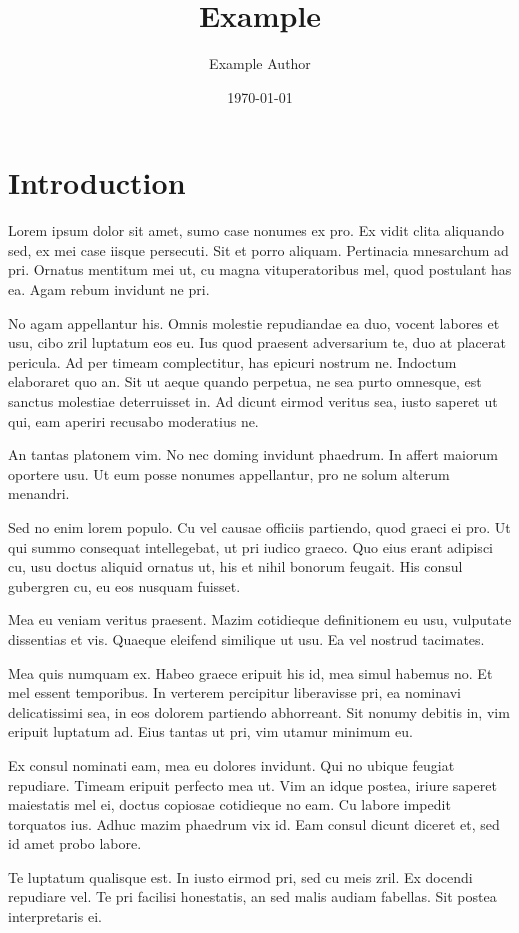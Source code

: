 \documentclass{article}
\title{Example}
\author {Example Author}
\date {\today}
\begin{document}
\maketitle
\listoffigures
\section{Introduction}
Lorem ipsum dolor sit amet, sumo case nonumes ex pro. Ex vidit clita aliquando sed, ex mei case iisque persecuti. Sit et porro aliquam. Pertinacia mnesarchum ad pri. Ornatus mentitum mei ut, cu magna vituperatoribus mel, quod postulant has ea. Agam rebum invidunt ne pri.


No agam appellantur his. Omnis molestie repudiandae ea duo, vocent labores et usu, cibo zril luptatum eos eu. Ius quod praesent adversarium te, duo at placerat pericula. Ad per timeam complectitur, has epicuri nostrum ne. Indoctum elaboraret quo an. Sit ut aeque quando perpetua, ne sea purto omnesque, est sanctus molestiae deterruisset in. Ad dicunt eirmod veritus sea, iusto saperet ut qui, eam aperiri recusabo moderatius ne.

An tantas platonem vim. No nec doming invidunt phaedrum. In affert maiorum oportere usu. Ut eum posse nonumes appellantur, pro ne solum alterum menandri.

Sed no enim lorem populo. Cu vel causae officiis partiendo, quod graeci ei pro. Ut qui summo consequat intellegebat, ut pri iudico graeco. Quo eius erant adipisci cu, usu doctus aliquid ornatus ut, his et nihil bonorum feugait. His consul gubergren cu, eu eos nusquam fuisset.

Mea eu veniam veritus praesent. Mazim cotidieque definitionem eu usu, vulputate dissentias et vis. Quaeque eleifend similique ut usu. Ea vel nostrud tacimates.

Mea quis numquam ex. Habeo graece eripuit his id, mea simul habemus no. Et mel essent temporibus. In verterem percipitur liberavisse pri, ea nominavi delicatissimi sea, in eos dolorem partiendo abhorreant. Sit nonumy debitis in, vim eripuit luptatum ad. Eius tantas ut pri, vim utamur minimum eu.

Ex consul nominati eam, mea eu dolores invidunt. Qui no ubique feugiat repudiare. Timeam eripuit perfecto mea ut. Vim an idque postea, iriure saperet maiestatis mel ei, doctus copiosae cotidieque no eam. Cu labore impedit torquatos ius. Adhuc mazim phaedrum vix id. Eam consul dicunt diceret et, sed id amet probo labore.

Te luptatum qualisque est. In iusto eirmod pri, sed cu meis zril. Ex docendi repudiare vel. Te pri facilisi honestatis, an sed malis audiam fabellas. Sit postea interpretaris ei.
\end{document}
